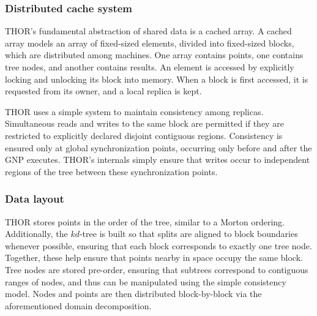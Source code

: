 \documentclass[twoside,leqno,twocolumn]{article}
\newcommand{\mysubsub}[1]{\subsubsection{#1} }
\begin{document}
\mysubsub{Distributed cache system}

THOR's fundamental abstraction of shared data is a cached array.
A cached array models an array of fixed-sized elements, divided into fixed-sized blocks, which are distributed among machines.
One array contains points, one contains tree nodes, and another contains results.
An element is accessed by explicitly locking and unlocking its block into memory.
When a block is first accessed, it is requested from its owner, and a local replica is kept.

THOR uses a simple system to maintain consistency among replicas.
Simultaneous reads and writes to the same block are permitted if they are restricted to explicitly declared disjoint contiguous regions.
Consistency is ensured only at global synchronization points, occurring only before and after the GNP executes.
THOR's internals simply ensure that writes occur to independent regions of the tree between these synchronization points.




\mysubsub{Data layout}
THOR stores points in the order of the tree, similar to a Morton ordering.
Additionally, the $kd$-tree is built so that splits are aligned to block boundaries whenever possible, ensuring that each block corresponds to exactly one tree node.
Together, these help ensure that points nearby in space occupy the same block.
Tree nodes are stored pre-order, ensuring that subtrees correspond to contiguous ranges of nodes, and thus can be manipulated using the simple consistency model.
Nodes and points are then distributed block-by-block via the aforementioned domain decomposition.
\end{document}
